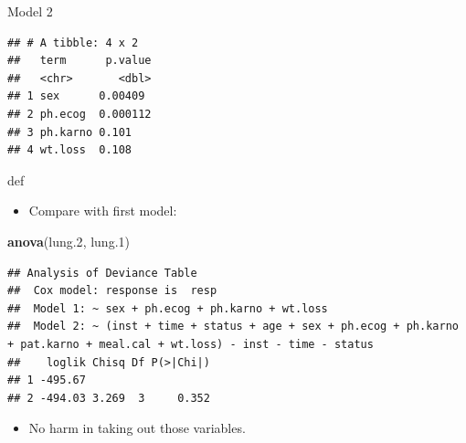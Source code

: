 \documentclass[ignorenonframetext,]{beamer}
\newenvironment{Shaded}{\begin{snugshade}}{\end{snugshade}}
\newcommand{\FloatTok}[1]{\textcolor[rgb]{0.00,0.00,0.81}{#1}}
\newcommand{\KeywordTok}[1]{\textcolor[rgb]{0.13,0.29,0.53}{\textbf{#1}}}
\newcommand{\NormalTok}[1]{#1}
\newcommand{\OperatorTok}[1]{\textcolor[rgb]{0.81,0.36,0.00}{\textbf{#1}}}
\newcommand{\StringTok}[1]{\textcolor[rgb]{0.31,0.60,0.02}{#1}}
\providecommand{\tightlist}{%
  \setlength{\itemsep}{0pt}\setlength{\parskip}{0pt}}
\begin{document}
\begin{frame}[fragile]{Model 2}
\protect\hypertarget{model-2}{}

\begin{Shaded}
\end{Shaded}

\begin{verbatim}
## # A tibble: 4 x 2
##   term      p.value
##   <chr>       <dbl>
## 1 sex      0.00409 
## 2 ph.ecog  0.000112
## 3 ph.karno 0.101   
## 4 wt.loss  0.108
\end{verbatim}

def

\begin{itemize}
\tightlist
\item
  Compare with first model:
\end{itemize}

\begin{Shaded}
\begin{Highlighting}[]
\KeywordTok{anova}\NormalTok{(lung}\FloatTok{.2}\NormalTok{, lung}\FloatTok{.1}\NormalTok{)}
\end{Highlighting}
\end{Shaded}

\begin{verbatim}
## Analysis of Deviance Table
##  Cox model: response is  resp
##  Model 1: ~ sex + ph.ecog + ph.karno + wt.loss
##  Model 2: ~ (inst + time + status + age + sex + ph.ecog + ph.karno + pat.karno + meal.cal + wt.loss) - inst - time - status
##    loglik Chisq Df P(>|Chi|)
## 1 -495.67                   
## 2 -494.03 3.269  3     0.352
\end{verbatim}

\begin{itemize}
\tightlist
\item
  No harm in taking out those variables.
\end{itemize}

\end{frame}
\end{document}
